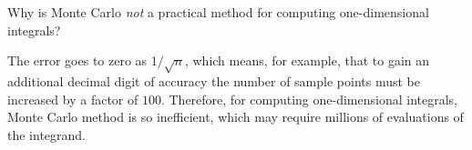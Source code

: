 \begin{pro}
  Why is Monte Carlo \emph{not} a practical method for
  computing one-dimensional integrals?
\end{pro}

\begin{sol}
  The error goes to zero as $1/\sqrt{n}$,
  which means, for example,
  that to gain an additional decimal digit of accuracy
  the number of sample points must be increased by a factor of $100$.
  Therefore,
  for computing one-dimensional integrals,
  Monte Carlo method is so inefficient,
  which may require millions of evaluations of the integrand.
\end{sol}
